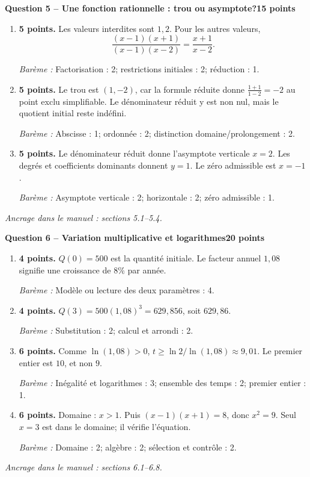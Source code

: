\documentclass[11pt,a4paper]{article}
\begin{document}
\newpage
{\large\bfseries Question 5 -- Une fonction rationnelle : trou ou asymptote?}\hfill\textbf{15 points}\par
\begin{enumerate}
\item \textbf{5 points.} Les valeurs interdites sont \(1,2\). Pour les autres valeurs, \[\frac{(x-1)(x+1)}{(x-1)(x-2)}=\frac{x+1}{x-2}.\]
\par{\small\textit{Barème : }Factorisation : 2; restrictions initiales : 2; réduction : 1.}
\item \textbf{5 points.} Le trou est \((1,-2)\), car la formule réduite donne \(\frac{1+1}{1-2}=-2\) au point exclu simplifiable. Le dénominateur réduit y est non nul, mais le quotient initial reste indéfini.
\par{\small\textit{Barème : }Abscisse : 1; ordonnée : 2; distinction domaine/prolongement : 2.}
\item \textbf{5 points.} Le dénominateur réduit donne l’asymptote verticale \(x=2\). Les degrés et coefficients dominants donnent \(y=1\). Le zéro admissible est \(x=-1\).
\par{\small\textit{Barème : }Asymptote verticale : 2; horizontale : 2; zéro admissible : 1.}
\end{enumerate}
\vfill {\small\textit{Ancrage dans le manuel : sections 5.1--5.4.}}

\newpage
{\large\bfseries Question 6 -- Variation multiplicative et logarithmes}\hfill\textbf{20 points}\par
\begin{enumerate}
\item \textbf{4 points.} \(Q(0)=500\) est la quantité initiale. Le facteur annuel \(1{,}08\) signifie une croissance de \(8\%\) par année.
\par{\small\textit{Barème : }Modèle ou lecture des deux paramètres : 4.}
\item \textbf{4 points.} \(Q(3)=500(1{,}08)^3=629{,}856\), soit \(629{,}86\).
\par{\small\textit{Barème : }Substitution : 2; calcul et arrondi : 2.}
\item \textbf{6 points.} Comme \(\ln(1{,}08)>0\), \(t\ge\ln2/\ln(1{,}08)\approx9{,}01\). Le premier entier est \(10\), et non \(9\).
\par{\small\textit{Barème : }Inégalité et logarithmes : 3; ensemble des temps : 2; premier entier : 1.}
\item \textbf{6 points.} Domaine : \(x>1\). Puis \((x-1)(x+1)=8\), donc \(x^2=9\). Seul \(x=3\) est dans le domaine; il vérifie l’équation.
\par{\small\textit{Barème : }Domaine : 2; algèbre : 2; sélection et contrôle : 2.}
\end{enumerate}
\vfill {\small\textit{Ancrage dans le manuel : sections 6.1--6.8.}}
\end{document}

